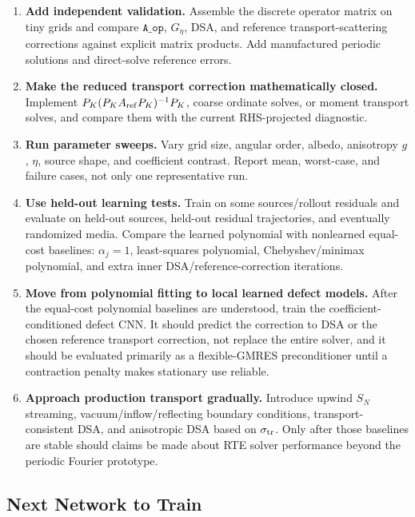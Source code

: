 \documentclass[11pt]{article}
\begin{document}
\begin{enumerate}
\item \textbf{Add independent validation.}
Assemble the discrete operator matrix on tiny grids and compare
\(\texttt{A\_op}\), \(G_\eta\), DSA, and reference transport-scattering
corrections against explicit matrix products.  Add manufactured periodic
solutions and direct-solve reference errors.

\item \textbf{Make the reduced transport correction mathematically closed.}
Implement \(P_K(P_KA_{\rm ref}P_K)^{-1}P_K\), coarse ordinate solves, or moment
transport solves, and compare them with the current RHS-projected diagnostic.

\item \textbf{Run parameter sweeps.}
Vary grid size, angular order, albedo, anisotropy \(g\), \(\eta\), source
shape, and coefficient contrast.  Report mean, worst-case, and failure cases,
not only one representative run.

\item \textbf{Use held-out learning tests.}
Train on some sources/rollout residuals and evaluate on held-out sources,
held-out residual trajectories, and eventually randomized media.  Compare the
learned polynomial with nonlearned equal-cost baselines:
\(\alpha_j=1\), least-squares polynomial, Chebyshev/minimax polynomial, and
extra inner DSA/reference-correction iterations.

\item \textbf{Move from polynomial fitting to local learned defect models.}
After the equal-cost polynomial baselines are understood, train the
coefficient-conditioned defect CNN.  It should predict the correction to
DSA or the chosen reference transport correction, not replace the entire solver,
and it should be evaluated primarily as
a flexible-GMRES preconditioner until a contraction penalty makes stationary
use reliable.

\item \textbf{Approach production transport gradually.}
Introduce upwind \(S_N\) streaming, vacuum/inflow/reflecting boundary
conditions, transport-consistent DSA, and anisotropic DSA based on
\(\sigma_{\rm tr}\).  Only after those baselines are stable should claims be
made about RTE solver performance beyond the periodic Fourier prototype.
\end{enumerate}

\subsection{Next Network to Train}
\end{document}
